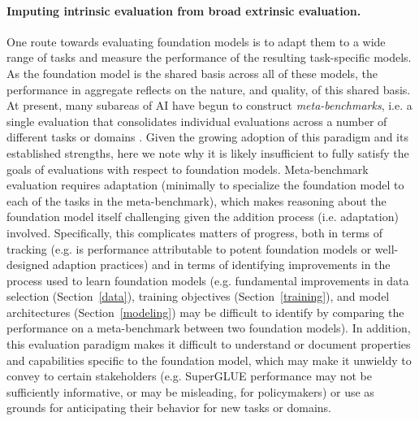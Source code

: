 \paragraph{Imputing intrinsic evaluation from broad extrinsic evaluation.} One route towards evaluating foundation models is to adapt them to a wide range of tasks and measure the performance of the resulting task-specific models. As the foundation model is the shared basis across all of these models, the performance in aggregate reflects on the nature, and quality, of this shared basis. At present, many subareas of AI have begun to construct \textit{meta-benchmarks}, i.e. a single evaluation that consolidates individual evaluations across a number of different tasks or domains \citep{wang2019glue, wang2019superglue, hu2020xtreme, santurkar2020breeds, gehrmann-etal-2021-gem, hendrycks2021measuring, koh2021wilds, Tamkin2021DABS}. Given the growing adoption of this paradigm and its established strengths, here we note why it is likely insufficient to fully satisfy the goals of evaluations with respect to foundation models. Meta-benchmark evaluation requires adaptation (minimally to specialize the foundation model to each of the tasks in the meta-benchmark), which makes reasoning about the foundation model itself challenging given the addition process (i.e. adaptation) involved. Specifically, this complicates matters of progress, both in terms of tracking (e.g. is performance attributable to potent foundation models or well-designed adaption practices) and in terms of identifying improvements in the process used to learn foundation models (e.g. fundamental improvements in data selection (Section~\ref{data}), training objectives (Section~\ref{training}), and model architectures (Section~\ref{modeling}) may be difficult to identify by comparing the performance on a meta-benchmark between two foundation models). In addition, this evaluation paradigm makes it difficult to understand or document properties and capabilities specific to the foundation model, which may make it unwieldy to convey to certain stakeholders (e.g. SuperGLUE performance may not be sufficiently informative, or may be misleading, for policymakers) or use as grounds for anticipating their behavior for new tasks or domains.  


